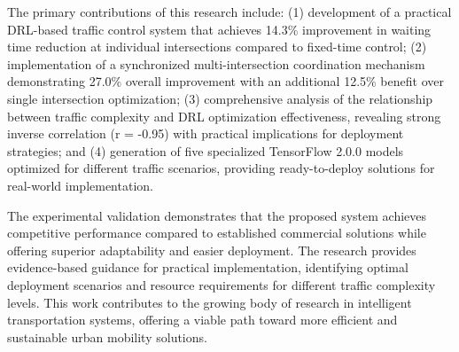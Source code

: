The primary contributions of this research include: (1) development of a practical DRL-based traffic 
control system that achieves 14.3\% improvement in waiting time reduction at individual intersections 
compared to fixed-time control; (2) implementation of a synchronized multi-intersection coordination 
mechanism demonstrating 27.0\% overall improvement with an additional 12.5\% benefit over single 
intersection optimization; (3) comprehensive analysis of the relationship between traffic complexity 
and DRL optimization effectiveness, revealing strong inverse correlation (r = -0.95) with practical 
implications for deployment strategies; and (4) generation of five specialized TensorFlow 2.0.0 models 
optimized for different traffic scenarios, providing ready-to-deploy solutions for real-world implementation.

The experimental validation demonstrates that the proposed system achieves competitive performance compared to established commercial solutions while offering superior adaptability and easier deployment. The research provides evidence-based guidance for practical implementation, identifying optimal deployment scenarios and resource requirements for different traffic complexity levels. This work contributes to the growing body of research in intelligent transportation systems, offering a viable path toward more efficient and sustainable urban mobility solutions.
